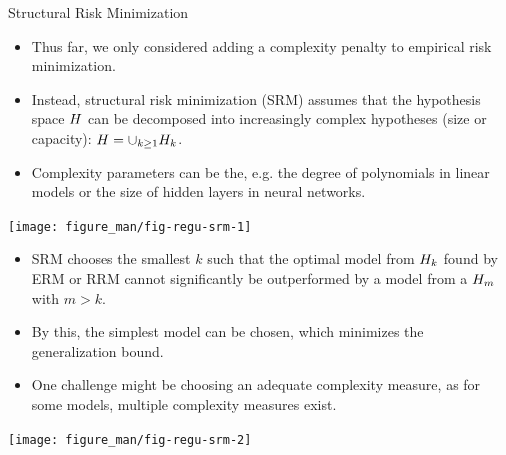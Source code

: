 \begin{vbframe} {Structural Risk Minimization}

\begin{itemize}
  \item Thus far, we only considered adding a complexity penalty to empirical risk minimization. 
  \item Instead,  structural risk minimization (SRM) assumes that the hypothesis space $H$ can be decomposed into increasingly complex hypotheses (size or capacity): $H = \cup_{k \geq 1 }H_{k}$. 
  \item Complexity parameters can be the, e.g. the degree of polynomials in linear models or the size of hidden layers in neural networks.  
\end{itemize}

\begin{center}
\texttt{[image: figure\_man/fig-regu-srm-1]}
\end{center}

\framebreak


\begin{itemize}

    \item SRM chooses the smallest $k$ such that the optimal model from $H_k$ found by ERM or RRM cannot significantly
        be outperformed by a model from a $H_m$ with $m > k$.
  \item By this, the simplest model can be chosen, which minimizes the generalization bound.  
  \item One challenge might be choosing an adequate complexity measure, as for some models, multiple complexity measures exist.
\end{itemize}

\begin{center}
\texttt{[image: figure\_man/fig-regu-srm-2]}
\end{center}

\end{vbframe}

